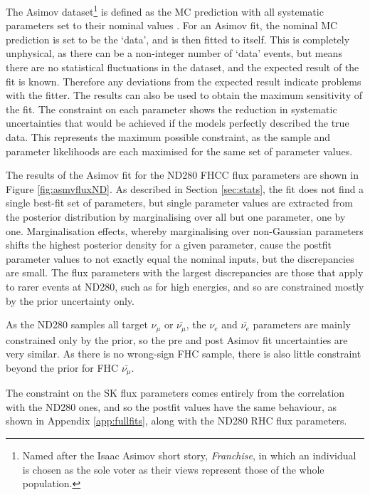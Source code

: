 The Asimov dataset\footnote{Named after the Isaac Asimov short story, \textit{Franchise}, in which an individual is chosen as the sole voter as their views represent those of the whole population.} is defined as the MC prediction with all systematic parameters set to their nominal values \cite{Cowan_2011}. For an Asimov fit, the nominal MC prediction is set to be the `data', and is then fitted to itself. This is completely unphysical, as there can be a non-integer number of `data' events, but means there are no statistical fluctuations in the dataset, and the expected result of the fit is known. Therefore any deviations from the expected result indicate problems with the fitter. The results can also be used to obtain the maximum sensitivity of the fit. The constraint on each parameter shows the reduction in systematic uncertainties that would be achieved if the models perfectly described the true data. This represents the maximum possible constraint, as the sample and parameter likelihoods are each maximised for the same set of parameter values.

The results of the Asimov fit for the ND280 FHCC flux parameters are shown in Figure \ref{fig:asmvfluxND}. As described in Section \ref{sec:stats}, the fit does not find a single best-fit set of parameters, but single parameter values are extracted from the posterior distribution by marginalising over all but one parameter, one by one. Marginalisation effects, whereby marginalising over non-Gaussian parameters shifts the highest posterior density for a given parameter, cause the postfit parameter values to not exactly equal the nominal inputs, but the discrepancies are small. The flux parameters with the largest discrepancies are those that apply to rarer events at ND280, such as for high energies, and so are constrained mostly by the prior uncertainty only.

As the ND280 samples all target $\nu_{\mu}$ or $\bar{\nu_{\mu}}$, the $\nu_e$ and $\bar{\nu_e}$ parameters are mainly constrained only by the prior, so the pre and post Asimov fit uncertainties are very similar. As there is no wrong-sign FHC sample, there is also little constraint beyond the prior for FHC $\bar{\nu_{\mu}}$. 

The constraint on the SK flux parameters comes entirely from the correlation with the ND280 ones, and so the postfit values have the same behaviour, as shown in Appendix \ref{app:fullfits}, along with the ND280 RHC flux parameters.

